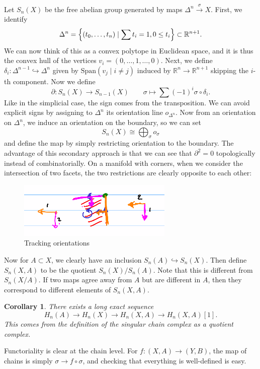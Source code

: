 \documentclass[leqno, openany]{memoir}
\newtheorem{cor}[thm]{Corollary}
\theoremstyle{definition}
\theoremstyle{remark}
\theoremstyle{plain}
\theoremstyle{definition}
\theoremstyle{remark}
\newcommand{\R}{\mathbb{R}}
\newcommand{\mr}[1]{\mathrm{#1}}
\begin{document}
Let $S_n(X)$ be the free abelian group generated by maps $\Delta^n \xrightarrow{\sigma} X$. First, we identify 
\[ \Delta^n = \qty{(t_0, \ldots, t_n) \mid \sum t_i = 1, 0 \leq t_i } \subset \R^{n+1}. \]
We can now think of this as a convex polytope in Euclidean space, and it is thus the convex hull of the vertices $v_i = (0, \ldots, 1, \ldots, 0)$. Next, we define $\delta_i \colon \Delta^{n-1} \hookrightarrow \Delta^n$ given by $\mr{Span}(v_j \mid i \neq j)$ induced by $\R^{n} \to \R^{n+1}$ skipping the $i$-th component. Now we define
\[ \partial \colon S_n(X) \to S_{n-1}(X) \qquad \sigma \mapsto \sum (-1)^i \sigma \circ \delta_i. \]
Like in the simplicial case, the sign comes from the transposition. We can avoid explicit signs by assigning to $\Delta^n$ its orientation line $o_{\Delta^n}$. Now from an orientation on $\Delta^n$, we induce an orientation on the boundary, so we can set
\[ S_n(X) \cong \bigoplus_{\sigma} o_{\sigma} \]
and define the map by simply restricting orientation to the boundary. The advantage of this secondary approach is that we can see that $\partial^2 = 0$ topologically instead of combinatorially. On a manifold with corners, when we consider the intersection of two facets, the two restrictions are clearly opposite to each other:
\begin{figure}[H]
    \centering
    \includegraphics[scale=1]{orientsimp.png}
    \caption{Tracking orientations}%
    \label{fig:orientsimp}
\end{figure}

Now for $A \subset X$, we clearly have an inclusion $S_n(A) \hookrightarrow S_n(X)$. Then define $S_n(X,A)$ to be the quotient $S_n(X) / S_n(A)$. Note that this is different from $S_n(X/A)$. If two maps agree away from $A$ but are different in $A$, then they correspond to different elements of $S_n(X,A)$.

\begin{cor}
    There exists a long exact sequence
    \[ H_n(A) \to H_n(X) \to H_n(X,A) \to H_n(X,A)[1]. \]
    This comes from the definition of the singular chain complex as a quotient complex.
\end{cor}

Functoriality is clear at the chain level. For $f \colon (X,A) \to (Y,B)$, the map of chains is simply $\sigma \to f \circ \sigma$, and checking that everything is well-defined is easy.
\end{document}
